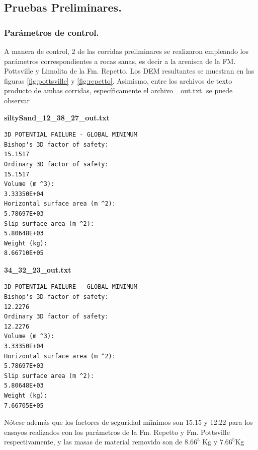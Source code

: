 \subsection{Pruebas Preliminares.}
\label{chap:pruebas preliminares}
\subsubsection{Par\'ametros de control.}

A manera de control, 2 de las corridas preliminares se realizaron empleando los par\'ametros correspondientes a rocas sanas, es decir a la arenisca de la FM. Pottsville y Limolita de la Fm. Repetto. Los DEM resultantes se muestran en las figuras \ref{fig:pottsville} y \ref{fig:repetto}.
Asimismo, entre los archivos de texto producto de ambas corridas, espec\'ificamente el archivo \_out.txt. se puede observar\linebreak


\pagebreak
\begin{center}
\textbf{siltySand\_12\_38\_27\_out.txt}

\begin{verbatim}
3D POTENTIAL FAILURE - GLOBAL MINIMUM
Bishop's 3D factor of safety:                                          15.1517
Ordinary 3D factor of safety:                                          15.1517
Volume (m ^3):                                                     3.33350E+04
Horizontal surface area (m ^2):                                    5.78697E+03
Slip surface area (m ^2):                                          5.80648E+03
Weight (kg):                                                       8.66710E+05
\end{verbatim}
\end{center}

\begin{center}

\textbf{34\_32\_23\_out.txt}
\begin{verbatim}
3D POTENTIAL FAILURE - GLOBAL MINIMUM
Bishop's 3D factor of safety:                                          12.2276
Ordinary 3D factor of safety:                                          12.2276
Volume (m ^3):                                                     3.33350E+04
Horizontal surface area (m ^2):                                    5.78697E+03
Slip surface area (m ^2):                                          5.80648E+03
Weight (kg):                                                       7.66705E+05
\end{verbatim}

\end{center}
N\'otese adem\'as que los factores de seguridad m\'iinimos son 15.15 y 12.22 para los ensayos realizados con los par\'ametros de la Fm. Repetto y Fm. Pottsville respectivamente, y las masas de material removido son de $8.66^{5}$ Kg y $7.66^{5}$Kg

